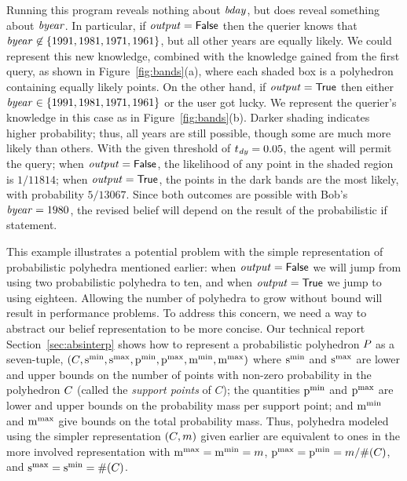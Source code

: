 \else
Running this program reveals
nothing about $\mathit{bday}$, but does reveal something about
$\mathit{byear}$.  In particular, if $\mathit{output} = \mathsf{False}$ then the
querier knows that $\mathit{byear} \not\in \{ 1991, 1981, 1971, 1961 \}$,
but all other years are equally likely.  We could represent this new
knowledge, combined with the knowledge gained from the first query, as
shown in Figure~\ref{fig:bands}(a), where each shaded box is a
polyhedron containing equally likely points.  On the other hand, if
$\mathit{output} = \mathsf{True}$ then either $\mathit{byear} \in \{ 1991, 1981,
1971, 1961 \}$ or the user got lucky.  We represent the querier's
knowledge in this case as in Figure~\ref{fig:bands}(b).  Darker
shading indicates higher probability; thus, all years are still
possible, though some are much more likely than others.  With the
given threshold of $t_{\mathit{dy}} = 0.05$, the agent will permit the
query; when $\mathit{output} = \mathsf{False}$, the likelihood of any point in
the shaded region is $1/11814$; when $\mathit{output} = \mathsf{True}$, the
points in the dark bands are the most likely, with probability $
5/13067 $.  Since both outcomes are possible with Bob's $\mathit{byear} =
1980$, the revised belief will depend on the result of the
probabilistic if statement.
\fi

This example illustrates a potential problem with the simple
representation of probabilistic polyhedra mentioned earlier: when
$\mathit{output} = \mathsf{False}$ we will jump from using two probabilistic
polyhedra to ten, and when $\mathit{output} = \mathsf{True}$ we jump to using
eighteen.  Allowing the number of polyhedra to grow without bound will
result in performance problems. To address this concern, we need a way
to abstract our belief representation to be more concise.
\ifacita
Our technical report~\cite{TR} 
\else
Section~\ref{sec:absinterp} 
\fi
shows how to represent a probabilistic
polyhedron $P_{}$ as a seven-tuple, $(C_{},\mathrm{s}^\mathrm{min}_{}, \mathrm{s}^\mathrm{max}_{}, \mathrm{p}^\mathrm{min}_{},
\mathrm{p}^\mathrm{max}_{}, \mathrm{m}^\mathrm{min}_{}, \mathrm{m}^\mathrm{max}_{})$ where $\mathrm{s}^\mathrm{min}_{}$ and $ \mathrm{s}^\mathrm{max}_{}$ are lower
and upper bounds on the number of points with non-zero probability
 in the polyhedron $C_{}$ (called the \textit{support points} of $C$);
the quantities $\mathrm{p}^\mathrm{min}_{} $ and $ \mathrm{p}^\mathrm{max}_{} $ are lower and
upper bounds on the probability mass per support point; and $ \mathrm{m}^\mathrm{min}_{}
$ and $ \mathrm{m}^\mathrm{max}_{} $ give bounds on the total probability mass. Thus,
polyhedra modeled using the simpler representation $(C_{},m)$
given earlier are equivalent to ones in the more involved
representation with $\mathrm{m}^\mathrm{max}_{} = \mathrm{m}^\mathrm{min}_{} = m$, $\mathrm{p}^\mathrm{max}_{} = \mathrm{p}^\mathrm{min}_{} = m /
\#(C_{})$, and $\mathrm{s}^\mathrm{max}_{} = \mathrm{s}^\mathrm{min}_{} = \#(C_{})$.

